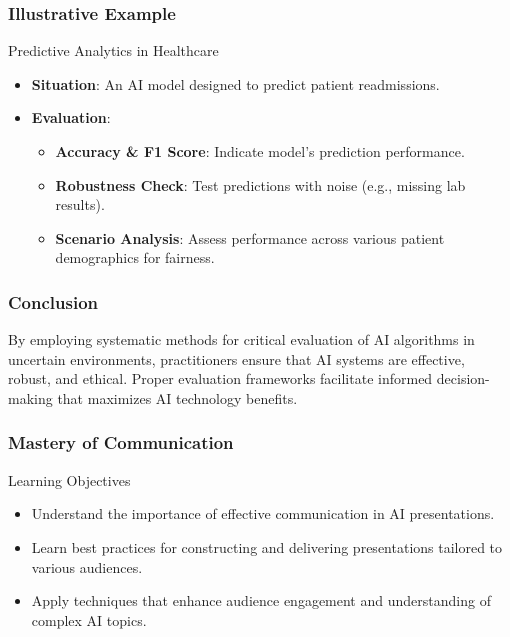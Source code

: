 \documentclass[aspectratio=169]{beamer}
\begin{document}
\begin{frame}[fragile]
    \frametitle{Illustrative Example}
    \begin{block}{Predictive Analytics in Healthcare}
        \begin{itemize}
            \item \textbf{Situation}: An AI model designed to predict patient readmissions.
            \item \textbf{Evaluation}:
                \begin{itemize}
                    \item \textbf{Accuracy \& F1 Score}: Indicate model's prediction performance.
                    \item \textbf{Robustness Check}: Test predictions with noise (e.g., missing lab results).
                    \item \textbf{Scenario Analysis}: Assess performance across various patient demographics for fairness.
                \end{itemize}
        \end{itemize}
    \end{block}
\end{frame}

\begin{frame}[fragile]
    \frametitle{Conclusion}
    By employing systematic methods for critical evaluation of AI algorithms in uncertain environments, practitioners ensure that AI systems are effective, robust, and ethical. Proper evaluation frameworks facilitate informed decision-making that maximizes AI technology benefits.
\end{frame}

\begin{frame}[fragile]
    \frametitle{Mastery of Communication}
    \begin{block}{Learning Objectives}
        \begin{itemize}
            \item Understand the importance of effective communication in AI presentations.
            \item Learn best practices for constructing and delivering presentations tailored to various audiences.
            \item Apply techniques that enhance audience engagement and understanding of complex AI topics.
        \end{itemize}
    \end{block}
\end{frame}
\end{document}
